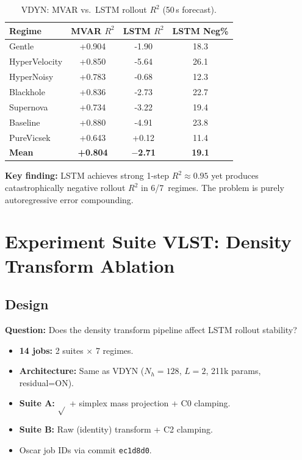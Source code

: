 \documentclass[11pt]{article}
\newcommand{\Rtwo}{R^2}
\newcommand{\regime}[1]{\textsf{#1}}
\begin{document}
\begin{table}[H]
\centering
\caption{VDYN: MVAR vs.\ LSTM rollout $\Rtwo$ (50\,s forecast).}
\label{tab:vdyn}
\small
\begin{tabular}{@{}l S[table-format=+1.3] S[table-format=+1.3] S[table-format=2.1] @{}}
\toprule
Regime & {MVAR $\Rtwo$} & {LSTM $\Rtwo$} & {LSTM Neg\%} \\
\midrule
\regime{Gentle}       & +0.904 & -1.90 & 18.3 \\
\regime{HyperVelocity}& +0.850 & -5.64 & 26.1 \\
\regime{HyperNoisy}   & +0.783 & -0.68 & 12.3 \\
\regime{Blackhole}    & +0.836 & -2.73 & 22.7 \\
\regime{Supernova}    & +0.734 & -3.22 & 19.4 \\
\regime{Baseline}     & +0.880 & -4.91 & 23.8 \\
\regime{PureVicsek}   & +0.643 & +0.12 & 11.4 \\
\midrule
\textbf{Mean}         & \textbf{+0.804} & \textbf{$-$2.71} & \textbf{19.1} \\
\bottomrule
\end{tabular}
\end{table}

\textbf{Key finding:} LSTM achieves strong 1-step $\Rtwo \approx 0.95$ yet
produces catastrophically negative rollout $\Rtwo$ in 6/7~regimes.
The problem is purely autoregressive error compounding.


\section{Experiment Suite VLST: Density Transform Ablation}
\label{sec:vlst}

\subsection{Design}

\textbf{Question:} Does the density transform pipeline affect LSTM rollout stability?

\begin{itemize}[nosep]
  \item \textbf{14 jobs:} 2 suites $\times$ 7 regimes.
  \item \textbf{Architecture:} Same as VDYN ($N_h=128$, $L=2$, 211k params, residual=ON).
  \item \textbf{Suite A:} $\sqrt{}$ + simplex mass projection + C0 clamping.
  \item \textbf{Suite B:} Raw (identity) transform + C2 clamping.
  \item Oscar job IDs via commit \texttt{ec1d8d0}.
\end{itemize}
\end{document}
